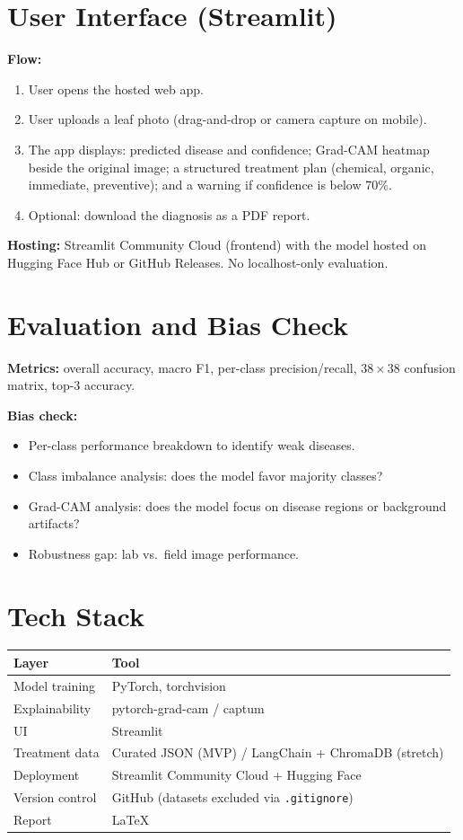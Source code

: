 \documentclass[11pt,a4paper]{article}
\begin{document}
\section{User Interface (Streamlit)}
\textbf{Flow:}
\begin{enumerate}
  \item User opens the hosted web app.
  \item User uploads a leaf photo (drag-and-drop or camera capture on mobile).
  \item The app displays: predicted disease and confidence; Grad-CAM heatmap beside the original image; a structured treatment plan (chemical, organic, immediate, preventive); and a warning if confidence is below 70\%.
  \item Optional: download the diagnosis as a PDF report.
\end{enumerate}
\textbf{Hosting:} Streamlit Community Cloud (frontend) with the model hosted on Hugging Face Hub or GitHub Releases. No localhost-only evaluation.

\section{Evaluation and Bias Check}
\textbf{Metrics:} overall accuracy, macro F1, per-class precision/recall, $38\times38$ confusion matrix, top-3 accuracy.

\textbf{Bias check:}
\begin{itemize}
  \item Per-class performance breakdown to identify weak diseases.
  \item Class imbalance analysis: does the model favor majority classes?
  \item Grad-CAM analysis: does the model focus on disease regions or background artifacts?
  \item Robustness gap: lab vs.\ field image performance.
\end{itemize}

\section{Tech Stack}
\begin{table}[h]
\centering
\begin{tabular}{@{}ll@{}}
\toprule
Layer & Tool \\
\midrule
Model training & PyTorch, torchvision \\
Explainability & pytorch-grad-cam / captum \\
UI & Streamlit \\
Treatment data & Curated JSON (MVP) / LangChain + ChromaDB (stretch) \\
Deployment & Streamlit Community Cloud + Hugging Face \\
Version control & GitHub (datasets excluded via \texttt{.gitignore}) \\
Report & \LaTeX{} \\
\bottomrule
\end{tabular}
\end{table}
\end{document}
